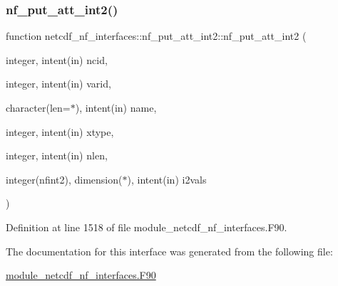 \subsubsection{\texorpdfstring{nf\+\_\+put\+\_\+att\+\_\+int2()}{nf\_put\_att\_int2()}}
{\footnotesize\ttfamily function netcdf\+\_\+nf\+\_\+interfaces\+::nf\+\_\+put\+\_\+att\+\_\+int2\+::nf\+\_\+put\+\_\+att\+\_\+int2 (\begin{DoxyParamCaption}\item[{integer, intent(in)}]{ncid,  }\item[{integer, intent(in)}]{varid,  }\item[{character(len=$\ast$), intent(in)}]{name,  }\item[{integer, intent(in)}]{xtype,  }\item[{integer, intent(in)}]{nlen,  }\item[{integer(nfint2), dimension($\ast$), intent(in)}]{i2vals }\end{DoxyParamCaption})}



Definition at line 1518 of file module\+\_\+netcdf\+\_\+nf\+\_\+interfaces.\+F90.



The documentation for this interface was generated from the following file\+:\begin{DoxyCompactItemize}
\item 
\hyperlink{module__netcdf__nf__interfaces_8F90}{module\+\_\+netcdf\+\_\+nf\+\_\+interfaces.\+F90}\end{DoxyCompactItemize}
